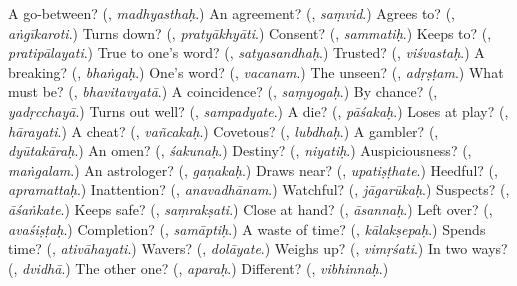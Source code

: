 \begin{tcolorbox}[breakable,colback=teal!4,colframe=teal!35!black,title={Before you move on}]
A go-between? (\textbf{}, \emph{madhyasthaḥ}.) An agreement? (\textbf{}, \emph{saṃvid}.) Agrees to? (\textbf{}, \emph{aṅgīkaroti}.) Turns down? (\textbf{}, \emph{pratyākhyāti}.) Consent? (\textbf{}, \emph{sammatiḥ}.) Keeps to? (\textbf{}, \emph{pratipālayati}.) True to one's word? (\textbf{}, \emph{satyasandhaḥ}.) Trusted? (\textbf{}, \emph{viśvastaḥ}.) A breaking? (\textbf{}, \emph{bhaṅgaḥ}.) One's word? (\textbf{}, \emph{vacanam}.) The unseen? (\textbf{}, \emph{adṛṣṭam}.) What must be? (\textbf{}, \emph{bhavitavyatā}.) A coincidence? (\textbf{}, \emph{saṃyogaḥ}.) By chance? (\textbf{}, \emph{yadṛcchayā}.) Turns out well? (\textbf{}, \emph{sampadyate}.) A die? (\textbf{}, \emph{pāśakaḥ}.) Loses at play? (\textbf{}, \emph{hārayati}.) A cheat? (\textbf{}, \emph{vañcakaḥ}.) Covetous? (\textbf{}, \emph{lubdhaḥ}.) A gambler? (\textbf{}, \emph{dyūtakāraḥ}.) An omen? (\textbf{}, \emph{śakunaḥ}.) Destiny? (\textbf{}, \emph{niyatiḥ}.) Auspiciousness? (\textbf{}, \emph{maṅgalam}.) An astrologer? (\textbf{}, \emph{gaṇakaḥ}.) Draws near? (\textbf{}, \emph{upatiṣṭhate}.) Heedful? (\textbf{}, \emph{apramattaḥ}.) Inattention? (\textbf{}, \emph{anavadhānam}.) Watchful? (\textbf{}, \emph{jāgarūkaḥ}.) Suspects? (\textbf{}, \emph{āśaṅkate}.) Keeps safe? (\textbf{}, \emph{saṃrakṣati}.) Close at hand? (\textbf{}, \emph{āsannaḥ}.) Left over? (\textbf{}, \emph{avaśiṣṭaḥ}.) Completion? (\textbf{}, \emph{samāptiḥ}.) A waste of time? (\textbf{}, \emph{kālakṣepaḥ}.) Spends time? (\textbf{}, \emph{ativāhayati}.) Wavers? (\textbf{}, \emph{dolāyate}.) Weighs up? (\textbf{}, \emph{vimṛśati}.) In two ways? (\textbf{}, \emph{dvidhā}.) The other one? (\textbf{}, \emph{aparaḥ}.) Different? (\textbf{}, \emph{vibhinnaḥ}.)
\end{tcolorbox}

